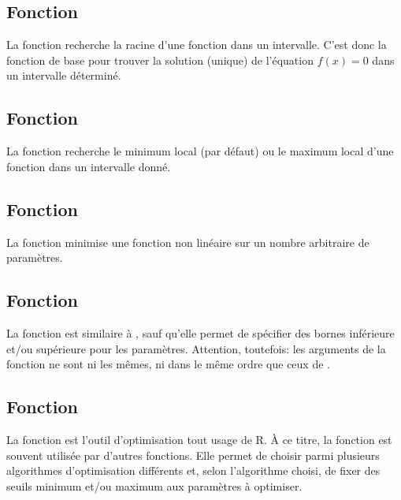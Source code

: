 \subsection{Fonction }
\label{optimisation:fonctions:uniroot}

La fonction  recherche la racine d'une fonction dans un intervalle.
C'est donc la fonction de base pour trouver la solution (unique) de
l'équation $f(x) = 0$ dans un intervalle déterminé.


\subsection{Fonction }
\label{optimisation:fonctions:optimize}

La fonction  recherche le
minimum local (par
défaut) ou le maximum local d'une fonction dans un intervalle donné.


\subsection{Fonction }
\label{optimisation:fonctions:nlm}

La fonction  minimise une fonction non
linéaire
sur un nombre arbitraire de paramètres.


\subsection{Fonction }
\label{optimisation:fonctions:nlminb}

La fonction  est similaire à , sauf
qu'elle permet de spécifier des bornes inférieure et/ou supérieure
pour les paramètres. Attention, toutefois: les arguments de la
fonction ne sont ni les mêmes, ni dans le même ordre que ceux de
.


\subsection{Fonction }
\label{optimisation:fonctions:optim}

La fonction  est l'outil
d'optimisation tout usage de R. À ce titre, la fonction est souvent
utilisée par d'autres fonctions. Elle permet de choisir parmi
plusieurs algorithmes d'optimisation différents et, selon l'algorithme
choisi, de fixer des seuils minimum et/ou maximum aux paramètres à
optimiser.


